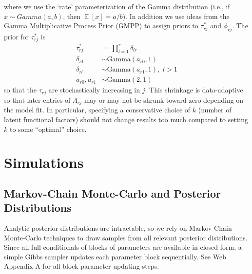 \documentclass[useAMS,referee,usenatbib]{biom}
\DeclareMathOperator{\E}{\mathbb{E}}
\begin{document}
where we use the `rate' parameterization of the Gamma distribution (i.e., if $x \sim Gamma(a, b)$, then $\E[x] = a/b$). In addition we use ideas from the Gamma Multiplicative Process Prior (GMPP) \citep{Bhattacharya2011, Montagna2012} to assign priors to $\tau^{*}_{rj}$ and $\phi_{rj}$. The prior for $\tau^{*}_{rj}$ is
\begin{align}
\label{eq:shrink1}\tau^{*}_{rj} &= \prod_{l=1}^{r}\delta_{lr}\\
\label{eq:shrink2}\delta_{r1} &\sim \text{Gamma}(a_{r0}, 1)\\
\label{eq:shrink3}\delta_{rl} &\sim \text{Gamma}(a_{r1}, 1),\,\, l > 1\\
\label{eq:shrink4}a_{r0}, a_{r1} &\sim \text{Gamma}(2,1)
\end{align}
so that the $\tau_{rj}$ are stochastically increasing in $j$. This shrinkage is data-adaptive so that later entries of $\Lambda_{rj}$ may or may not be shrunk toward zero depending on the model fit. In particular, specifying a conservative choice of $k$ (number of latent functional factors) should not change results too much compared to setting $k$ to some ``optimal'' choice. 

\section{Simulations}
\subsection{Markov-Chain Monte-Carlo and Posterior Distributions}
\label{s:posteriors}
\iffalse Analytic posterior distributions are intractable, so we rely on Markov-Chain Monte-Carlo techniques to draw samples from all relevant posterior distributions. Since all full conditionals of blocks of parameters are available in closed form, a simple Gibbs sampler updates each parameter block sequentially. See Web Appendix A for all block parameter updating steps.

\end{document}
